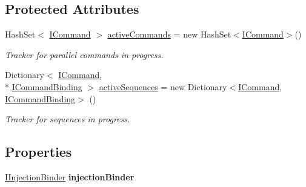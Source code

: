\subsection*{Protected Attributes}
\begin{DoxyCompactItemize}
\item 
\hypertarget{classstrange_1_1extensions_1_1command_1_1impl_1_1_command_binder_a8b6b770089f105b017000c9957aa7125}{Hash\-Set$<$ \hyperlink{interfacestrange_1_1extensions_1_1command_1_1api_1_1_i_command}{I\-Command} $>$ \hyperlink{classstrange_1_1extensions_1_1command_1_1impl_1_1_command_binder_a8b6b770089f105b017000c9957aa7125}{active\-Commands} = new Hash\-Set$<$\hyperlink{interfacestrange_1_1extensions_1_1command_1_1api_1_1_i_command}{I\-Command}$>$()}\label{classstrange_1_1extensions_1_1command_1_1impl_1_1_command_binder_a8b6b770089f105b017000c9957aa7125}

\begin{DoxyCompactList}\small\item\em Tracker for parallel commands in progress. \end{DoxyCompactList}\item 
\hypertarget{classstrange_1_1extensions_1_1command_1_1impl_1_1_command_binder_ada066db5cf3c3014735a7874260ed4b1}{Dictionary$<$ \hyperlink{interfacestrange_1_1extensions_1_1command_1_1api_1_1_i_command}{I\-Command}, \\*
\hyperlink{interfacestrange_1_1extensions_1_1command_1_1api_1_1_i_command_binding}{I\-Command\-Binding} $>$ \hyperlink{classstrange_1_1extensions_1_1command_1_1impl_1_1_command_binder_ada066db5cf3c3014735a7874260ed4b1}{active\-Sequences} = new Dictionary$<$\hyperlink{interfacestrange_1_1extensions_1_1command_1_1api_1_1_i_command}{I\-Command}, \hyperlink{interfacestrange_1_1extensions_1_1command_1_1api_1_1_i_command_binding}{I\-Command\-Binding}$>$ ()}\label{classstrange_1_1extensions_1_1command_1_1impl_1_1_command_binder_ada066db5cf3c3014735a7874260ed4b1}

\begin{DoxyCompactList}\small\item\em Tracker for sequences in progress. \end{DoxyCompactList}\end{DoxyCompactItemize}
\subsection*{Properties}
\begin{DoxyCompactItemize}
\item 
\hypertarget{classstrange_1_1extensions_1_1command_1_1impl_1_1_command_binder_a011d8c52fdd8fdfffbc3d61089d3ff19}{\hyperlink{interfacestrange_1_1extensions_1_1injector_1_1api_1_1_i_injection_binder}{I\-Injection\-Binder} {\bfseries injection\-Binder}}\label{classstrange_1_1extensions_1_1command_1_1impl_1_1_command_binder_a011d8c52fdd8fdfffbc3d61089d3ff19}

\end{DoxyCompactItemize}


